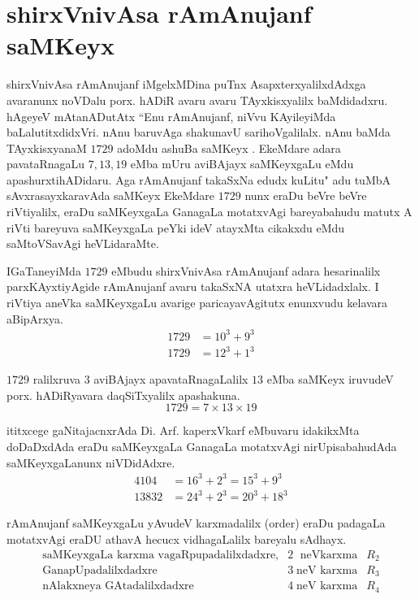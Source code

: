 \chapter{shirxVnivAsa rAmAnujanf saMKeyx}

shirxVnivAsa rAmAnujanf iMgelxMDina puTnx AsapxterxyalilxdAdxga avaranunx noVDalu  porx. hADiR avaru avaru TAyxkisxyalilx baMdidadxru. hAgeyeV mAtanADutAtx ``Enu rAmAnujanf, niVvu KAyileyiMda baLalutitxdidxVri. nAnu baruvAga shakunavU sarihoVgalilalx. nAnu baMda TAyxkisxyanaM $1729$ adoMdu ashuBa saMKeyx . EkeMdare adara pavataRnagaLu $7,13,19$ eMba mUru aviBAjayx saMKeyxgaLu eMdu apashurxtihADidaru. Aga rAmAnujanf takaSxNa edudx kuLitu" adu tuMbA sAvxrasayxkaravAda saMKeyx EkeMdare $1729$ nunx eraDu beVre beVre riVtiyalilx, eraDu saMKeyxgaLa GanagaLa motatxvAgi bareyabahudu matutx A riVti bareyuva saMKeyxgaLa peYki ideV atayxMta cikakxdu eMdu saMtoVSavAgi heVLidaraMte.

IGaTaneyiMda $1729$ eMbudu shirxVnivAsa rAmAnujanf adara hesarinalilx parxKAyxtiyAgide rAmAnujanf avaru takaSxNA utatxra heVLidadxlalx. I riVtiya aneVka saMKeyxgaLu avarige paricayavAgitutx enunxvudu kelavara aBipArxya.
\begin{align*}
1729 &= 10^3+9^3\\
1729 &= 12^3+1^3 
\end{align*}

$1729$ ralilxruva $3$ aviBAjayx apavataRnagaLalilx $13$ eMba saMKeyx iruvudeV porx. hADiRyavara daqSiTxyalilx apashakuna.
$$
1729 = 7\times 13 \times 19
$$

ititxcege gaNitajacnxrAda Di. Arf. kaperxVkarf eMbuvaru idakikxMta doDaDxdAda eraDu saMKeyxgaLa GanagaLa motatxvAgi nirUpisabahudAda saMKeyxgaLanunx niVDidAdxre.
\begin{align*}
4104 &= 16^3 + 2^3 = 15^3 +9^3\\
13832 &= 24^3 +2^3 = 20^3 +18^3
\end{align*}

rAmAnujanf saMKeyxgaLu yAvudeV karxmadalilx {\rm(order)} eraDu padagaLa motatxvAgi eraDU athavA hecucx vidhagaLalilx bareyalu sAdhayx.
$$
\begin{array}{rll}
\text{saMKeyxgaLa karxma vagaRpupadalilxdadxre,} & 2\; \text{ neVkarxma} & R_2\\
\text{GanapUpadalilxdadxre}                      & 3\; \text{neV karxma} & R_3\\
\text{nAlakxneya GAtadalilxdadxre}               & 4\; \text{neV karxma} & R_4
\end{array}
$$

